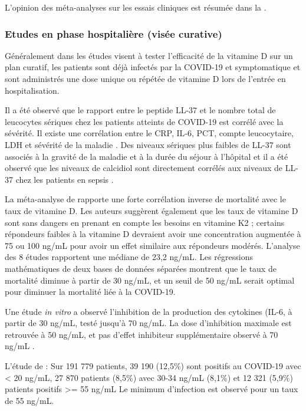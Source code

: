 \documentclass[
  a4paper,
  DIV=11,
  numbers=noendperiod,
  listof=totoc]{scrreprt}
\begin{document}
L'opinion des méta-analyses sur les essais cliniques est résumée dans la
.

\subsubsection{Etudes en phase hospitalière (visée
curative)}\label{etudes-en-phase-hospitaliuxe8re-visuxe9e-curative}

Généralement dans les études visent à tester l'efficacité de la vitamine
D sur un plan curatif, les patients sont déjà infectés par la COVID-19
et symptomatique et sont administrés une dose unique ou répétée de
vitamine D lors de l'entrée en hospitalisation.

Il a été observé que le rapport entre le peptide LL-37 et le nombre
total de leucocytes sériques chez les patients atteints de COVID-19 est
corrélé avec la sévérité. Il existe une corrélation entre le CRP, IL‑6,
PCT, compte leucocytaire, LDH et sévérité de la maladie
\autocite{Keutmann.2022}. Des niveaux sériques plus faibles de LL-37
sont associés à la gravité de la maladie et à la durée du séjour à
l'hôpital \autocite{Keutmann.2022} et il a été observé que les niveaux
de calcidiol sont directement corrélés aux niveaux de LL-37 chez les
patients en sepsis \autocite{Cutuli.2024}.

La méta-analyse de \textcite{Borsche.2021} rapporte une forte
corrélation inverse de mortalité avec le taux de vitamine D. Les auteurs
suggèrent également que les taux de vitamine D sont sans dangers en
prenant en compte les besoins en vitamine K2 ; certains répondeurs
faibles à la vitamine D devraient avoir une concentration augmentée à 75
ou 100 ng/mL pour avoir un effet similaire aux répondeurs modérés.
L'analyse des 8 études rapportent une médiane de 23,2 ng/mL. Les
régressions mathématiques de deux bases de données séparées montrent que
le taux de mortalité diminue à partir de 30 ng/mL, et un seuil de 50
ng/mL serait optimal pour diminuer la mortalité liée à la COVID-19.

Une étude \emph{in vitro} a observé l'inhibition de la production des
cytokines (IL-6, à partir de 30 ng/mL, testé jusqu'à 70 ng/mL. La dose
d'inhibition maximale est retrouvée à 50 ng/mL, et pas d'effet
inhibiteur supplémentaire observé à 70 ng/mL \autocite{Zhang.2012}.

L'étude de \textcite{Kaufman.2020} : Sur 191 779 patients, 39 190
(12,5\%) sont positifs au COVID-19 avec \textless{} 20 ng/mL, 27 870
patients (8,5\%) avec 30-34 ng/mL (8,1\%) et 12 321 (5,9\%) patients
positifs \textgreater= 55 ng/mL Le minimum d'infection est observé pour
un taux de 55 ng/mL.
\end{document}

